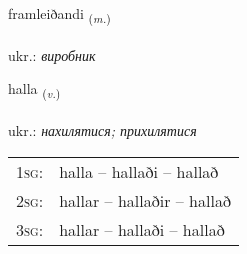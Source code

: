 \documentclass[frontgrid, backgrid]{flacards}\usepackage[]{graphicx}\usepackage[]{xcolor}
\begin{document}
\renewcommand{\flhead}{\vskip5pt \fboxsep=0pt {\small\bfseries\footnotesize Nafnorð | іменник}}
\renewcommand{\fcfoot}{\vskip5pt \fboxsep=0pt \hspace{2pt}{\small\bfseries\footnotesize 2K}}

\renewcommand{\blhead}{\vskip5pt {\small\bfseries\footnotesize Nafnorð | іменник }}
\renewcommand{\bcfoot}{\vskip5pt \hspace{2pt}{\small\bfseries\footnotesize 2K}}


{framleiðandi \small{\textsubscript{(\textit{m.})}} \\[1ex] %
\textphonetic{[framleiðantɪ]} \\
ukr.: \emph{виробник} \\  [2ex]
\renewcommand*{\arraystretch}{0.8}
}

\renewcommand{\flhead}{\vskip5pt \fboxsep=0pt {\small\bfseries\footnotesize Sagnorð | дієслово}}
\renewcommand{\fcfoot}{\vskip5pt \fboxsep=0pt \hspace{2pt}{\small\bfseries\footnotesize 2K}}

\renewcommand{\blhead}{\vskip5pt {\small\bfseries\footnotesize Sagnorð | дієслово }}
\renewcommand{\bcfoot}{\vskip5pt \hspace{2pt}{\small\bfseries\footnotesize 2K}}


{halla \small{\textsubscript{(\textit{v.})}} \\[1ex] %
\textphonetic{[hatla]} \\
ukr.: \emph{нахилятися; прихилятися} \\  [2ex]
\renewcommand*{\arraystretch}{0.8}
\begin{tabular}{p{1cm}l}
\textsc{1sg}: & halla -- hallaði -- hallað \\ 
\textsc{2sg}: & hallar -- hallaðir -- hallað \\ 
\textsc{3sg}: & hallar -- hallaði -- hallað \\ 
\end{tabular}
}
\end{document}
